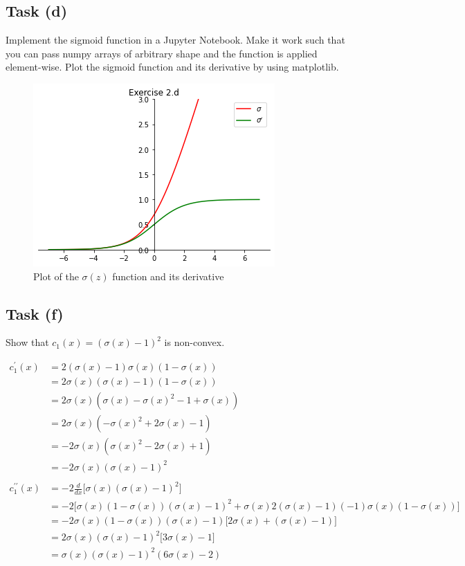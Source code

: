 \documentclass[onecolumn]{article}
\begin{document}
\subsection{Task (d)}
Implement the sigmoid function in a Jupyter Notebook. Make it work such that you can
pass numpy arrays of arbitrary shape and the function is applied element-wise. Plot the
sigmoid function and its derivative by using matplotlib. 

\begin{figure}[tbh]
	\centering
	\includegraphics[width=.5\linewidth]{fig/exercise_2d.png}
	\caption{Plot of the $\sigma(z)$ function and its derivative}
\end{figure}

\subsection{Task (f)}
Show that $c_1(x) = (\sigma(x) -1)^2$ is non-convex.

\begin{align*}
	c_1^{\prime}(x) &= 2(\sigma(x)-1)\sigma(x)(1-\sigma(x)) && \\
	&= 2\sigma(x)(\sigma(x)-1)(1-\sigma(x)) && \\
	&= 2\sigma(x)(\sigma(x) - \sigma(x)^2 -1 + \sigma(x)) && \\
	&= 2\sigma(x)(-\sigma(x)^2 + 2\sigma(x) - 1) && \\
	&= -2\sigma(x)(\sigma(x)^2 -2\sigma(x) + 1) && \\
	&= -2\sigma(x)(\sigma(x) - 1)^2 && \\
	\\
	c_1^{\prime\prime}(x) &= -2\frac{d}{dx}\Big[\sigma(x)(\sigma(x) -1)^2\Big] && \\
	&= -2\Big[\sigma(x)(1-\sigma(x))(\sigma(x)-1)^2 + \sigma(x)2(\sigma(x) - 1)(-1)\sigma(x)(1-\sigma(x))\Big] && \\
	&= -2\sigma(x)(1-\sigma(x))(\sigma(x) - 1)\Big[2\sigma(x) +(\sigma(x)-1)\Big] && \\
	&= 2\sigma(x)(\sigma(x)-1)^2\Big[3\sigma(x)-1\Big] && \\
	&= \sigma(x)(\sigma(x)-1)^2(6\sigma(x)-2) && \\
\end{align*}
\end{document}
